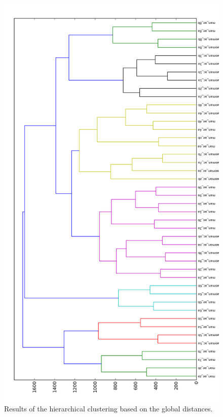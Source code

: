 \documentclass[12pt,a4paper,oneside]{article}
\begin{document}
\begin{figure}
\centering
\includegraphics[scale=0.4]{../dendrogram.png}
\caption{Results of the hierarchical clustering based on the global distances.}
\label{fig:dendro}
\end{figure}
\end{document}
